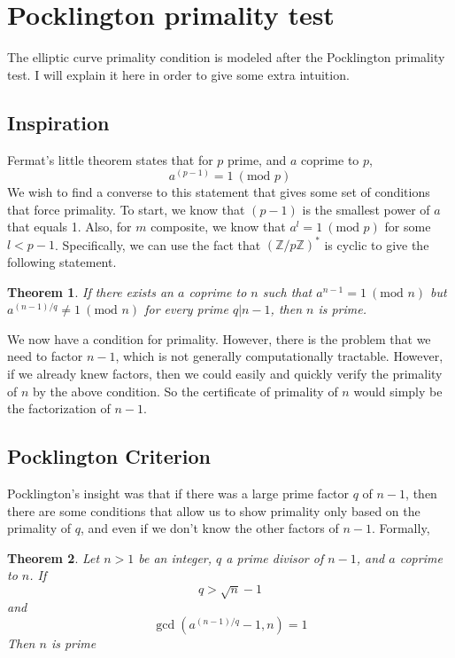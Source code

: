 \documentclass[]{article}
\newtheorem{theorem}{Theorem}
\newcommand{\Z}{\mathbb{Z}}
\newcommand{\ZMZ}[1]{\Z/#1\Z}
\newcommand{\Mod}[1]{\ (\text{mod }#1)}
\begin{document}
\section{Pocklington primality test}

The elliptic curve primality condition is modeled after the Pocklington primality test. I will explain it here in order to give some extra intuition.

\subsection{Inspiration}

Fermat's little theorem states that for $p$ prime, and $a$ coprime to $p$, $$a^{(p-1)}=1 \Mod{p}$$ We wish to find a converse to this statement that gives some set of conditions that force primality. To start, we know that $(p-1)$ is the smallest power of $a$ that equals 1. Also, for $m$ composite, we know that $a^{l}=1 \Mod{p}$ for some $l < p-1$. Specifically, we can use the fact that $(\ZMZ{p})^*$ is cyclic to give the following statement.

\begin{theorem}
	If there exists an $a$ coprime to $n$ such that $a^{n-1} = 1 \Mod{n}$ but $a^{(n-1)/q} \ne 1 \Mod{n}$ for every prime $q | n-1$, then $n$ is prime.
\end{theorem}


We now have a condition for primality. However, there is the problem that we need to factor $n-1$, which is not generally computationally tractable. However, if we already knew factors, then we could easily and quickly verify the primality of $n$ by the above condition.
So the certificate of primality of $n$ would simply be the factorization of $n-1$.


\subsection{Pocklington Criterion}

Pocklington's insight was that if there was a large prime factor $q$ of $n-1$, then there are some conditions that allow us to show primality only based on the primality of $q$, and even if we don't know the other factors of $n-1$. Formally,

\begin{theorem}
Let $n > 1$ be an integer, $q$ a prime divisor of $n-1$, and $a$ coprime to $n$.
%
If $$q > \sqrt{n}-1$$ and $$\gcd(a^{(n-1)/q}-1,n) = 1$$
%
Then $n$ is prime
\end{theorem}
\end{document}
